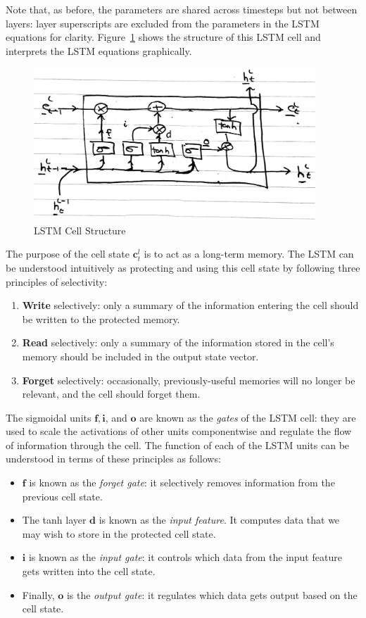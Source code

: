 \documentclass[12pt,a4paper,twoside,openright]{report}
\newcommand{\vect}[1]{\boldsymbol{\mathbf{#1}}}
\begin{document}
Note that, as before, the parameters are shared across timesteps but not between
layers: layer superscripts are excluded from the parameters in the LSTM
equations for clarity. Figure~\ref{fig:lstm-cell} shows the structure of this
LSTM cell and interprets the LSTM equations graphically.

\begin{figure}[H]
\centering
\includegraphics[width=300pt]{figs/lstm_detail_tmp.png}
\caption{LSTM Cell Structure}
\label{fig:lstm-cell}
\end{figure}

The purpose of the cell state $\vect{c}_t^l$ is to act as a long-term memory.
The LSTM can be understood intuitively as protecting and using this cell state
by following three principles of selectivity:
\begin{enumerate}[label=\arabic*., itemsep=0mm]
  \item \textbf{Write} selectively: only a summary of the information entering
    the cell should be written to the protected memory.
  \item \textbf{Read} selectively: only a summary of the information stored in
    the cell's memory should be included in the output state vector.
  \item \textbf{Forget} selectively: occasionally, previously-useful memories
    will no longer be relevant, and the cell should forget them.
\end{enumerate}

The sigmoidal units $\vect{f}, \vect{i}$, and $\vect{o}$ are known as the
\emph{gates} of the LSTM cell: they are used to scale the activations of other
units componentwise and regulate the flow of information through the cell. The
function of each of the LSTM units can be understood in terms of these
principles as follows:

\begin{itemize}
  \item $\vect{f}$ is known as the \emph{forget gate}: it selectively removes
    information from the previous cell state.
  \item The tanh layer $\vect{d}$ is known as the \emph{input feature}. It
    computes data that we may wish to store in the protected cell state.
\item $\vect{i}$ is known as the \emph{input gate}: it controls which data from
  the input feature gets written into the cell state.
\item Finally, $\vect{o}$ is the \emph{output gate}: it regulates which data
  gets output based on the cell state.
\end{itemize}
\end{document}

